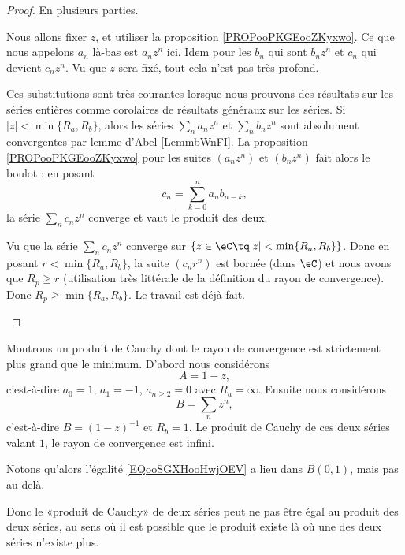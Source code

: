 \begin{proof}
	En plusieurs parties.
	\begin{subproof}
		\spitem[Préambule]
		Nous allons fixer \( z\), et utiliser la proposition \ref{PROPooPKGEooZKyxwo}. Ce que nous appelons \( a_n\) là-bas est \( a_nz^n\) ici. Idem pour les \( b_n\) qui sont \( b_nz^n\) et \( c_n\) qui devient \( c_nz^n\). Vu que \( z\) sera fixé, tout cela n'est pas très profond.

		Ces substitutions sont très courantes lorsque nous prouvons des résultats sur les séries entières comme corolaires de résultats généraux sur les séries.
		Si \( | z |<\min\{ R_a,R_b \}\), alors les séries \( \sum_na_nz^n\) et \( \sum_nb_nz^n\) sont absolument convergentes par lemme d'Abel \ref{LemmbWnFI}. La proposition \ref{PROPooPKGEooZKyxwo} pour les suites \( (a_nz^n)\) et \( (b_nz^n)\) fait alors le boulot : en posant
		\begin{equation}
			c_n=\sum_{k=0}^na_nb_{n-k},
		\end{equation}
		la série \( \sum_nc_nz^n\) converge et vaut le produit des deux.

		Vu que la série \( \sum_nc_nz^n\) converge sur \( \{ z\in \eC\tq | z |<\min\{ R_a,R_b \} \}\). Donc en posant \( r<\min\{ R_a,R_b \}\), la suite \( (c_nr^n)\) est bornée (dans \( \eC\)) et nous avons que \( R_p\geq r\) (utilisation très littérale de la définition du rayon de convergence). Donc \( R_p\geq\min \{ R_a,R_b \}\).
		Le travail est déjà fait.
	\end{subproof}
\end{proof}

\begin{example}
	Montrons un produit de Cauchy dont le rayon de convergence est strictement plus grand que le minimum. D'abord nous considérons
	\begin{equation}
		A=1-z,
	\end{equation}
	c'est-à-dire \( a_0=1\), \( a_1=-1\), \( a_{n\geq 2}=0\) avec \( R_a=\infty\). Ensuite nous considérons
	\begin{equation}
		B=\sum_nz^n,
	\end{equation}
	c'est-à-dire \( B=(1-z)^{-1}\) et \( R_b=1\). Le produit de Cauchy de ces deux séries valant \( 1\), le rayon de convergence est infini.

	Notons qu'alors l'égalité \eqref{EQooSGXHooHwjOEV} a lieu dans \( B(0,1)\), mais pas au-delà.

	Donc le «produit de Cauchy» de deux séries peut ne pas être égal au produit des deux séries, au sens où il est possible que le produit existe là où une des deux séries n'existe plus.
\end{example}

